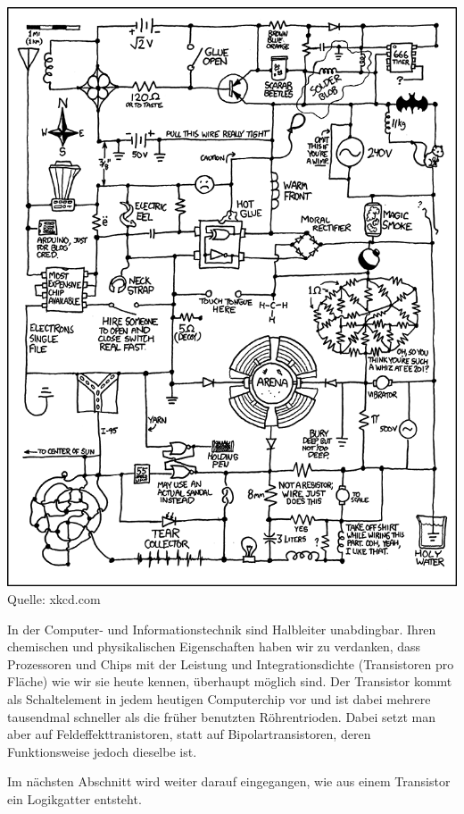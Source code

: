 \begin{center}
\includegraphics[scale=.55]{com/circuit}
\\
Quelle: xkcd.com
\end{center}

In der Computer- und Informationstechnik sind Halbleiter unabdingbar.
Ihren chemischen und physikalischen Eigenschaften haben wir zu verdanken, dass Prozessoren und Chips mit der Leistung und Integrationsdichte (Transistoren pro Fläche) wie wir sie heute kennen, überhaupt möglich sind.
Der Transistor kommt als Schaltelement in jedem heutigen Computerchip vor und ist dabei mehrere tausendmal schneller als die früher benutzten Röhrentrioden.
Dabei setzt man aber auf Feldeffekttranistoren, statt auf Bipolartransistoren, deren Funktionsweise jedoch dieselbe ist.

Im nächsten Abschnitt wird weiter darauf eingegangen, wie aus einem Transistor ein Logikgatter entsteht.